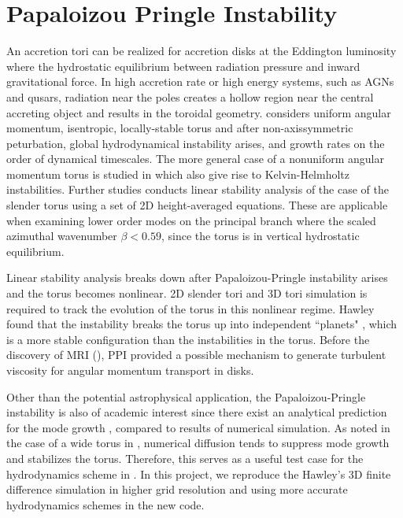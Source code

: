 \documentclass[iop,revtex4]{emulateapj}
\begin{document}
\section{Papaloizou Pringle Instability}
An accretion tori can be realized for accretion disks at the Eddington luminosity where the hydrostatic equilibrium between radiation pressure and inward gravitational force. In high accretion rate or high energy systems, such as AGNs and qusars, radiation near the poles creates a hollow region near the central accreting object and results in the toroidal geometry. \cite{Papaloizou:1984A} considers uniform angular momentum, isentropic, locally-stable torus and after non-axissymmetric peturbation, global hydrodynamical instability arises, and growth rates on the order of dynamical timescales. The more general case of a nonuniform angular momentum torus is studied in \cite{Papaloizou:1985A} which also give rise to Kelvin-Helmholtz instabilities. Further studies conducts linear stability analysis of the case of the slender torus using a set of 2D height-averaged equations. These are applicable when examining lower order modes on the principal branch where the scaled azimuthal wavenumber $\beta<0.59$, since the torus is in vertical hydrostatic equilibrium. 
\par Linear stability analysis breaks down after Papaloizou-Pringle instability arises and the torus becomes nonlinear. 2D slender tori and 3D tori simulation is required to track the evolution of the torus in this nonlinear regime. Hawley found that the instability breaks the torus up into independent ``planets" , which is a more stable configuration than the instabilities in the torus. Before the discovery of \ac{MRI} (\cite{Balbus:1991A}), \ac{PPI} provided a possible mechanism to generate turbulent viscosity for angular momentum transport in disks. 
\par Other than the potential astrophysical application, the Papaloizou-Pringle instability is also of academic interest since there exist an analytical prediction for the mode growth \cite{Goldreich:1986A} , compared to results of numerical simulation. As noted in the case of a wide torus in \cite{Hawley:1991A}, numerical diffusion tends to suppress mode growth and stabilizes the torus. Therefore, this serves as a useful test case for the hydrodynamics scheme in \app. In this project, we reproduce the Hawley's 3D finite difference simulation in higher grid resolution and using more accurate hydrodynamics schemes in the new \app code.
\end{document}
